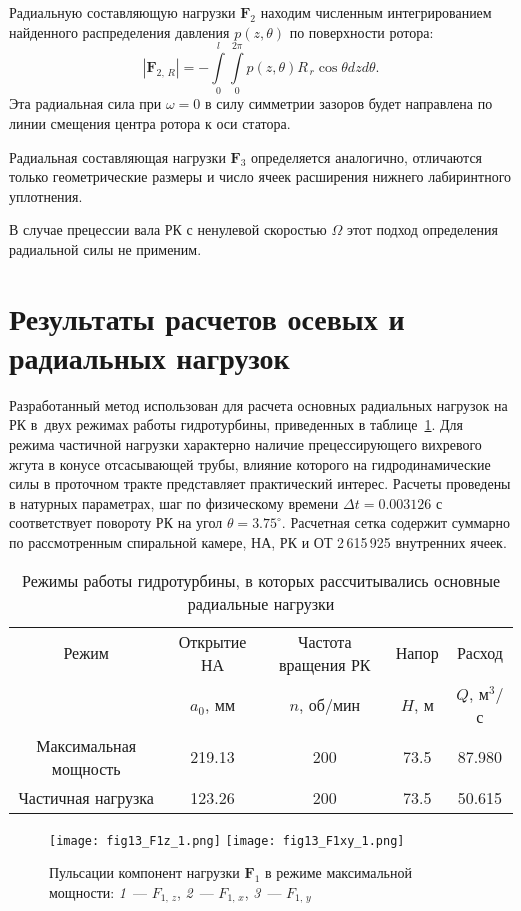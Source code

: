 Радиальную составляющую нагрузки $\textbf{F}_2$ находим численным интегрированием найденного 
распределения давления $p(z,\theta)$ по поверхности ротора:
\begin{equation}
  |\textbf{F}_{2,\,R}| = -\int\limits_0^l {\int\limits_0^{2\pi } 
  {p\left( {z,\theta } \right)R_{\,r} \cos \theta } } dzd\theta.
  \label{eq3:242}
\end{equation}
Эта радиальная сила при $\omega= 0$ в силу симметрии зазоров будет направлена по линии смещения центра 
ротора к оси статора.

Радиальная составляющая нагрузки $\textbf{F}_3$ определяется аналогично, отличаются только
геометрические размеры и число ячеек расширения нижнего лабиринтного уплотнения.

В случае прецессии вала РК с ненулевой скоростью $\Omega$ этот подход определения радиальной силы не применим.

\section{Результаты расчетов осевых и радиальных нагрузок}
\label{s:36}
Разработанный метод использован для расчета основных радиальных нагрузок на РК в~двух режимах 
работы гидротурбины,
приведенных в таблице~\ref{tab3:1}. Для режима частичной нагрузки характерно наличие прецессирующего 
вихревого жгута в конусе
отсасывающей трубы, влияние которого на гидродинамические силы в проточном тракте представляет 
практический интерес. Расчеты проведены
в натурных параметрах, шаг по физическому времени $\Delta t=0.003126$ с соответствует повороту 
РК на угол $\theta = 3.75^\circ$.
Расчетная сетка содержит суммарно по рассмотренным спиральной камере, НА, РК и ОТ 2\,615\,925 внутренних 
ячеек.
\begin{table}[t!]
  \centering\small\caption{Режимы работы гидротурбины, в которых рассчитывались 
  основные радиальные нагрузки}\vspace*{2mm}

  \begin{tabular}{|c|c|c|c|c|} \hline
  Режим             & Открытие НА& Частота вращения РК & Напор   & Расход       \\
                    &  $a_0$, мм &   $n$, об/мин &  $H$, м & $Q$, м$^3$/с \\ \hline
  Максимальная мощность    &   219.13   &     200       &  73.5   &    87.980    \\ %
  Частичная нагрузка&   123.26   &     200       &  73.5   &    50.615    \\ \hline
  \end{tabular}
\label{tab3:1}
\end{table}
\begin{figure}[!b]
  \centering
  {\texttt{[image: fig13\_F1z\_1.png]}}\hfill
  {\texttt{[image: fig13\_F1xy\_1.png]}}
  \caption{Пульсации компонент нагрузки $\textbf{F}_1$ в режиме максимальной мощности:
  {\sl 1}~--- $F_{1,\,z}$, {\sl 2}~--- $F_{1,\,x}$, {\sl 3}~--- $F_{1,\,y}$}
  \label{fig3:13}
\end{figure}

